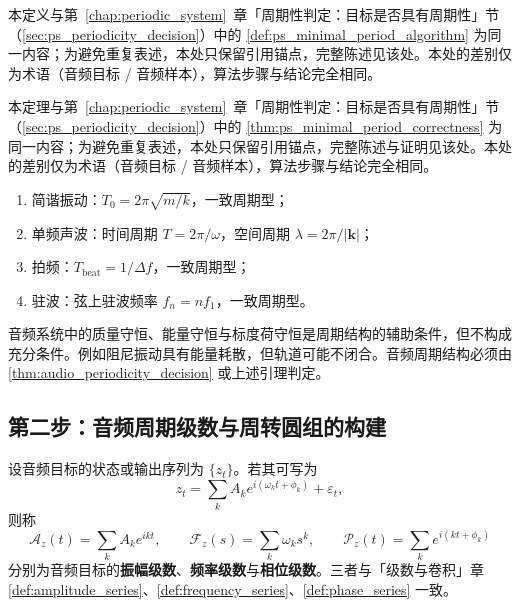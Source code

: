 \begin{definition}[音频最小正周期算法]\label{def:audio_minimal_period_algorithm}
本定义与第~\ref{chap:periodic_system}~章「周期性判定：目标是否具有周期性」节（\cref{sec:ps_periodicity_decision}）中的 \cref{def:ps_minimal_period_algorithm} 为同一内容；为避免重复表述，本处只保留引用锚点，完整陈述见该处。本处的差别仅为术语（音频目标 / 音频样本），算法步骤与结论完全相同。
\end{definition}

\begin{theorem}[音频最小正周期算法的正确性]\label{thm:audio_minimal_period_correctness}
本定理与第~\ref{chap:periodic_system}~章「周期性判定：目标是否具有周期性」节（\cref{sec:ps_periodicity_decision}）中的 \cref{thm:ps_minimal_period_correctness} 为同一内容；为避免重复表述，本处只保留引用锚点，完整陈述与证明见该处。本处的差别仅为术语（音频目标 / 音频样本），算法步骤与结论完全相同。
\end{theorem}

\begin{example}[音频周期判定实例]\label{ex:audio_periodic_examples}
\begin{enumerate}[label=(\roman*)]
    \item 简谐振动：$T_0=2\pi\sqrt{m/k}$，一致周期型；
    \item 单频声波：时间周期 $T=2\pi/\omega$，空间周期 $\lambda=2\pi/|\mathbf k|$；
    \item 拍频：$T_{\text{beat}}=1/\Delta f$，一致周期型；
    \item 驻波：弦上驻波频率 $f_n=n f_1$，一致周期型。
\end{enumerate}
\end{example}

\begin{remark}[守恒量不保证周期]\label{rem:audio_invariant_not_period}
音频系统中的质量守恒、能量守恒与标度荷守恒是周期结构的辅助条件，但不构成充分条件。例如阻尼振动具有能量耗散，但轨道可能不闭合。音频周期结构必须由 \cref{thm:audio_periodicity_decision} 或上述引理判定。
\end{remark}

\subsection{第二步：音频周期级数与周转圆组的构建}

\begin{definition}\label{def:audio_series}
设音频目标的状态或输出序列为 $\{z_t\}$。若其可写为
\[
z_t=\sum_k A_k e^{i(\omega_k t+\phi_k)}+\varepsilon_t,
\]
则称
\[
\mathcal A_z(t)=\sum_k A_k e^{ikt},\qquad
\mathcal F_z(s)=\sum_k \omega_k s^k,\qquad
\mathcal P_z(t)=\sum_k e^{i(kt+\phi_k)}
\]
分别为音频目标的\textbf{振幅级数}、\textbf{频率级数}与\textbf{相位级数}。三者与「级数与卷积」章 \cref{def:amplitude_series}、\cref{def:frequency_series}、\cref{def:phase_series} 一致。
\end{definition}

